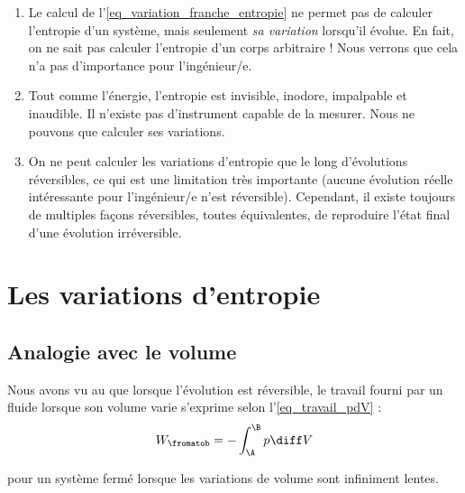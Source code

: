 			\begin{enumerate}
			
				\item Le calcul de l’\cref{eq_variation_franche_entropie} ne permet pas de calculer l’entropie d’un système, mais seulement \emph{sa variation} lorsqu’il évolue. En fait, on ne sait pas calculer l’entropie d’un corps arbitraire ! Nous verrons que cela n’a pas d’importance pour l’ingénieur/e.
		
				\item Tout comme l’énergie, l’entropie est invisible, inodore, impalpable et inaudible. Il n’existe pas d’instrument capable de la mesurer. Nous ne pouvons que calculer ses variations.

				\item On ne peut calculer les variations d’entropie que le long d’évolutions réversibles, ce qui est une limitation très importante (aucune évolution réelle intéressante pour l’ingénieur/e n’est réversible). Cependant, il existe toujours de multiples façons réversibles, toutes équivalentes, de reproduire l’état final d’une évolution irréversible. 
				
			\end{enumerate}
			

\section{Les variations d’entropie}
\label{ch_variations_entropie}

	\subsection{Analogie avec le volume}
	
		Nous avons vu au \coursdeux que lorsque l’évolution est réversible, le travail fourni par un fluide lorsque son volume varie s’exprime selon l’\cref{eq_travail_pdV} :
		\begin{equation}
			W_\fromatob = -\int_\A^\B p \diff V
		\end{equation}
		\begin{equationterms}
			\item pour un système fermé lorsque les variations de volume sont infiniment lentes.
		\end{equationterms}

